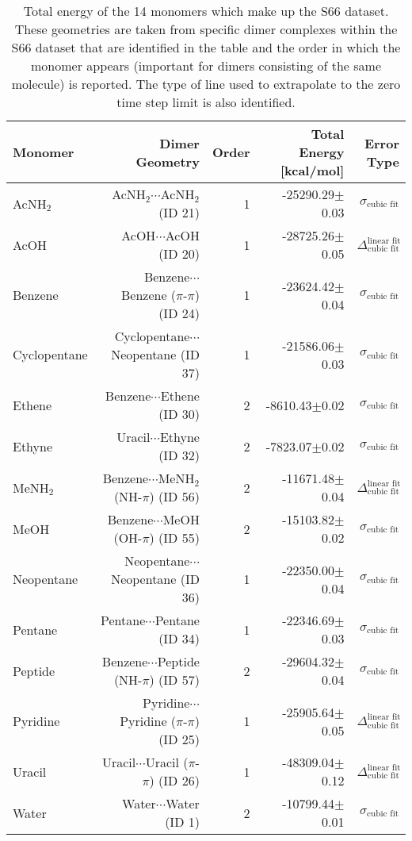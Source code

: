 \begin{table}
\caption{\label{tab:monomer_tot_ene}Total energy of the 14 monomers which make up the S66 dataset. These geometries are taken from specific dimer complexes within the S66 dataset that are identified in the table and the order in which the monomer appears (important for dimers consisting of the same molecule) is reported. The type of line used to extrapolate to the zero time step limit is also identified.}
\begin{adjustbox}{center}
\begin{tabular}{lrrrr}
\toprule
Monomer & Dimer Geometry & Order & Total Energy [kcal/mol] & Error Type \\ 
\midrule
AcNH$_2$ & AcNH$_2$$\cdots$AcNH$_2$ (ID 21) & 1 & -25290.29$\pm$0.03 & $\sigma_\textrm{cubic fit}$ \\
AcOH & AcOH$\cdots$AcOH (ID 20) & 1 & -28725.26$\pm$0.05 & $\Delta_\textrm{cubic fit}^\textrm{linear fit}$ \\
Benzene & Benzene$\cdots$Benzene ($\pi$-$\pi$) (ID 24) & 1 & -23624.42$\pm$0.04 & $\sigma_\textrm{cubic fit}$ \\
Cyclopentane & Cyclopentane$\cdots$Neopentane (ID 37) & 1 & -21586.06$\pm$0.03 & $\sigma_\textrm{cubic fit}$ \\
Ethene & Benzene$\cdots$Ethene (ID 30) & 2 & -8610.43$\pm$0.02 & $\sigma_\textrm{cubic fit}$ \\
Ethyne & Uracil$\cdots$Ethyne (ID 32) & 2 & -7823.07$\pm$0.02 & $\sigma_\textrm{cubic fit}$ \\
MeNH$_2$ & Benzene$\cdots$MeNH$_2$ (NH-$\pi$) (ID 56) & 2 & -11671.48$\pm$0.04 & $\Delta_\textrm{cubic fit}^\textrm{linear fit}$ \\
MeOH & Benzene$\cdots$MeOH (OH-$\pi$) (ID 55) & 2 & -15103.82$\pm$0.02 & $\sigma_\textrm{cubic fit}$ \\
Neopentane & Neopentane$\cdots$Neopentane (ID 36) & 1 & -22350.00$\pm$0.04 & $\sigma_\textrm{cubic fit}$ \\
Pentane & Pentane$\cdots$Pentane (ID 34) & 1 & -22346.69$\pm$0.03 & $\sigma_\textrm{cubic fit}$ \\
Peptide & Benzene$\cdots$Peptide (NH-$\pi$) (ID 57) & 2 & -29604.32$\pm$0.04 & $\sigma_\textrm{cubic fit}$ \\
Pyridine & Pyridine$\cdots$Pyridine ($\pi$-$\pi$) (ID 25) & 1 & -25905.64$\pm$0.05 & $\Delta_\textrm{cubic fit}^\textrm{linear fit}$ \\
Uracil & Uracil$\cdots$Uracil ($\pi$-$\pi$) (ID 26) & 1 & -48309.04$\pm$0.12 & $\Delta_\textrm{cubic fit}^\textrm{linear fit}$ \\
Water & Water$\cdots$Water (ID 1) & 2 & -10799.44$\pm$0.01 & $\sigma_\textrm{cubic fit}$ \\
\bottomrule
\end{tabular}
\end{adjustbox}
\end{table}